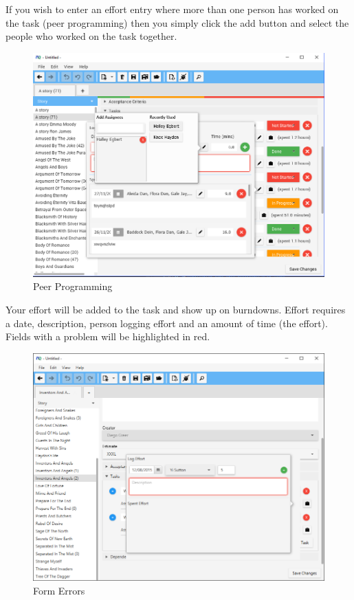If you wish to enter an effort entry where more than one person has worked on the task (peer programming) then you simply click the add button and select the people who worked on the task together.

\begin{figure}[H]
\centering
\includegraphics[width=\textwidth]{images/screenshots/peerprogramming1.png}
\caption{Peer Programming}
\label{fig:new_project}
\end{figure}

Your effort will be added to the task and show up on burndowns. Effort requires a date, description, person logging effort and an amount of time (the effort). Fields with a problem will be highlighted in red.

\begin{figure}[H]
\centering
\includegraphics[width=\textwidth]{images/screenshots/logging2.png}
\caption{Form Errors}
\label{fig:new_project}
\end{figure}

